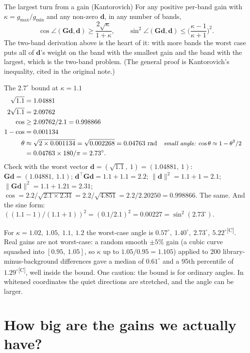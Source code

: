 \documentclass[11pt,a4paper,oneside,openany]{book}
\newcommand{\B}[1]{{\symbf{#1}}}
\newcommand{\B}[1]{{\bm{#1}}}
\newcommand{\comp}{\textsuperscript{\textsf{\scriptsize[C]}}}
\newcommand{\T}{^{\top}}
\newcommand{\nrm}[1]{\lVert #1\rVert}
\newcommand{\vd}{\B{d}}
\newcommand{\mG}{\B{G}}
\newcommand{\why}[1]{&&\text{\small\itshape #1}}
\begin{document}
\begin{rulebox}[label=rule:kant]{The largest turn from a gain (Kantorovich)}
For any positive per-band gain with $\kappa=g_{\max}/g_{\min}$ and any non-zero $\vd$, in any number of bands,
\[
  \cos\angle(\mG\vd,\vd)\ge\frac{2\sqrt\kappa}{1+\kappa},\qquad \sin^2\angle(\mG\vd,\vd)\le\Big(\frac{\kappa-1}{\kappa+1}\Big)^2 .
\]
The two-band derivation above is the heart of it: with more bands the worst case puts all of $\vd$'s weight on the band with the smallest gain and the band
with the largest, which is the two-band problem. (The general proof is Kantorovich's inequality, cited in the original note.)
\end{rulebox}

\begin{worked}[label=we:kant]{The $2.7^\circ$ bound at $\kappa=1.1$}
\begin{align*}
\sqrt{1.1} &= 1.04881\\
2\sqrt{1.1} &= 2.09762\\
\cos &\ge 2.09762/2.1=0.998866\\
1-\cos &= 0.001134\\
\theta &\approx\sqrt{2\times0.001134}=\sqrt{0.002268}=0.04763\text{ rad} \why{small angle: $\cos\theta\approx1-\theta^2/2$}\\
 &= 0.04763\times180/\pi=2.73^\circ .
\end{align*}
Check with the worst vector $\vd=(\sqrt{1.1},\ 1)=(1.04881,\ 1)$: $\mG\vd=(1.04881,\ 1.1)$; $\vd\T\mG\vd=1.1+1.1=2.2$; $\nrm{\vd}^2=1.1+1=2.1$;
$\nrm{\mG\vd}^2=1.1+1.21=2.31$; $\cos=2.2/\sqrt{2.1\times2.31}=2.2/\sqrt{4.851}=2.2/2.20250=0.998866$. The same. And the sine form:
$((1.1-1)/(1.1+1))^2=(0.1/2.1)^2=0.00227=\sin^2(2.73^\circ)$.
\end{worked}

For $\kappa=1.02,\ 1.05,\ 1.1,\ 1.2$ the worst-case angle is $0.57^\circ,\ 1.40^\circ,\ 2.73^\circ,\ 5.22^\circ$\comp. Real gains are not worst-case: a random smooth
$\pm5\%$ gain (a cubic curve squashed into $[0.95,\ 1.05]$, so $\kappa$ up to $1.05/0.95=1.105$) applied to 200 library-minus-background differences gave a median of
$0.61^\circ$ and a 95th percentile of $1.29^\circ$\comp, well inside the bound. One caution: the bound is for ordinary angles. In whitened coordinates the quiet
directions are stretched, and the angle can be larger.

\section{How big are the gains we actually have?}
\end{document}
